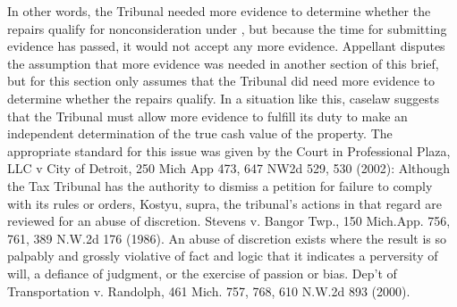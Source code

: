In other words, the Tribunal needed more evidence to determine whether the repairs qualify for nonconsideration under , but because the time for submitting evidence has passed, it would not accept any more evidence. Appellant disputes the assumption that more evidence was needed in another section of this brief, but for this section only assumes that the Tribunal did need more evidence to determine whether the repairs qualify. In a situation like this, caselaw suggests that the Tribunal must allow more evidence to fulfill its duty to make an independent determination of the true cash value of the property.
The appropriate standard for this issue was given by the Court in Professional Plaza, LLC v City of Detroit, 250 Mich App 473, 647 NW2d 529, 530 (2002): 
 Although the Tax Tribunal has the authority to dismiss a petition for failure to comply with its rules or orders, Kostyu, supra, the tribunal's actions in that regard are reviewed for an abuse of discretion. Stevens v. Bangor Twp., 150 Mich.App. 756, 761, 389 N.W.2d 176 (1986). An abuse of discretion exists where the result is so palpably and grossly violative of fact and logic that it indicates a perversity of will, a defiance of judgment, or the exercise of passion or bias. Dep't of Transportation v. Randolph, 461 Mich. 757, 768, 610 N.W.2d 893 (2000).
 
